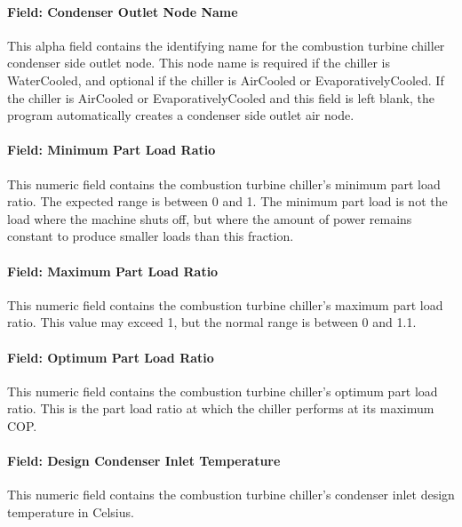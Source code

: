 \paragraph{Field: Condenser Outlet Node Name}\label{field-condenser-outlet-node-name-6}

This alpha field contains the identifying name for the combustion turbine chiller condenser side outlet node. This node name is required if the chiller is WaterCooled, and optional if the chiller is AirCooled or EvaporativelyCooled. If the chiller is AirCooled or EvaporativelyCooled and this field is left blank, the program automatically creates a condenser side outlet air node.

\paragraph{Field: Minimum Part Load Ratio}\label{field-minimum-part-load-ratio-6}

This numeric field contains the combustion turbine chiller's minimum part load ratio. The expected range is between 0 and 1. The minimum part load is not the load where the machine shuts off, but where the amount of power remains constant to produce smaller loads than this fraction.

\paragraph{Field: Maximum Part Load Ratio}\label{field-maximum-part-load-ratio-6}

This numeric field contains the combustion turbine chiller's maximum part load ratio. This value may exceed 1, but the normal range is between 0 and 1.1.

\paragraph{Field: Optimum Part Load Ratio}\label{field-optimum-part-load-ratio-6}

This numeric field contains the combustion turbine chiller's optimum part load ratio. This is the part load ratio at which the chiller performs at its maximum COP.

\paragraph{Field: Design Condenser Inlet Temperature}\label{field-design-condenser-inlet-temperature-4}

This numeric field contains the combustion turbine chiller's condenser inlet design temperature in Celsius.

